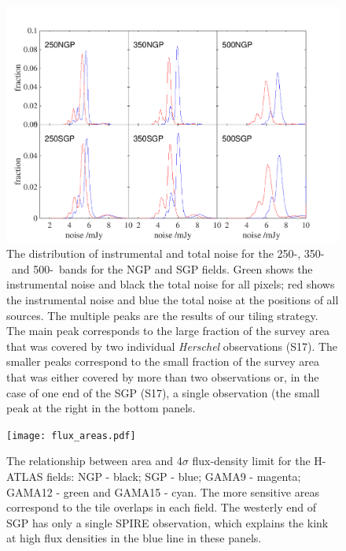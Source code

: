 \documentclass[a4paper,fleqn,usenatbib, twocolumn]{aastex61}
\begin{document}
\begin{figure} %
   \includegraphics[width=\textwidth]{noise_plots.pdf}
\caption{The distribution of instrumental and total noise for the
  250-\micron, 350-\micron\ and 500-\micron\  bands for the NGP and SGP
  fields.  Green shows the instrumental noise and black the total
  noise for all pixels; red shows the instrumental noise and blue the
  total noise at the positions of all sources.  The multiple peaks are
  the results of our tiling strategy. The main peak corresponds to the
  large fraction of the survey area that was covered by two individual
  {\it Herschel} observations (S17). The smaller peaks correspond to
  the small fraction of the survey area that was either covered by
  more than two observations or, in the case of one end of the SGP
  (S17), a single observation (the small peak at the right in the
  bottom panels.}
\label{fig_noise}
\end{figure}

\begin{figure} %
  \texttt{[image: flux\_areas.pdf]}
\caption{The relationship between area and 4$\sigma$ flux-density
  limit for the H-ATLAS fields: NGP - black; SGP - blue; GAMA9 -
  magenta; GAMA12 - green and  GAMA15 - cyan.  The more sensitive areas
  correspond to the tile overlaps in each field.  The westerly end of
  SGP has only a single SPIRE observation, which explains the kink at
  high flux densities in the blue line in these panels.}

\label{fig_areas}
\end{figure}
\end{document}
